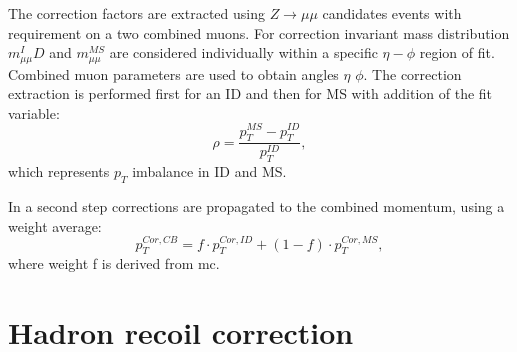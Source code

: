 The correction factors are extracted using $Z \to \mu \mu$ candidates events with requirement on a two combined muons. For correction invariant mass distribution $m_{\mu\mu}^ID$ and $m_{\mu\mu}^{MS}$ are considered individually within a specific $\eta - \phi$ region of fit. Combined muon parameters are used to obtain angles $\eta$ $\phi$. 
The correction extraction is performed first for an ID and then for MS with addition of the fit variable:
\begin{equation}
\rho = \frac{p_T^{MS}-p_T^{ID}}{p_T^{ID}},
\end{equation}
which represents $p_T$ imbalance in ID and MS. 

In a second step corrections are propagated to the combined momentum, using a weight average:
\begin{equation}
p_T^{Cor,CB}= f\cdot p_T^{Cor,ID}+(1-f) \cdot p_T^{Cor,MS},
\end{equation}
where weight f is derived from mc. 


\section{Hadron recoil correction}
